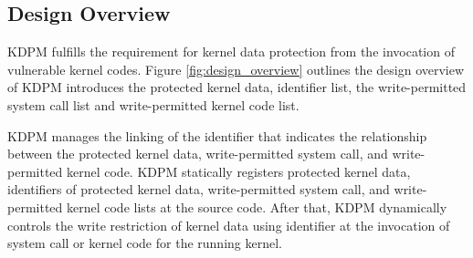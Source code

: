 



\subsection{Design Overview}

KDPM fulfills the requirement for kernel data protection from the invocation of
vulnerable kernel codes. 
%
Figure \ref{fig:design_overview} outlines the design overview of 
%
KDPM introduces the protected kernel data, identifier list, the
write-permitted system call list and write-permitted kernel code list.

%
KDPM manages the linking of the identifier that indicates the relationship between
the protected kernel data, write-permitted system call, and write-permitted kernel
code.
%
KDPM statically registers protected kernel data, identifiers of protected kernel
data, write-permitted system call, and write-permitted kernel code lists at the
source code. After that, KDPM dynamically controls the write restriction of
kernel data using identifier at the invocation of system call or kernel code for
the running kernel.

